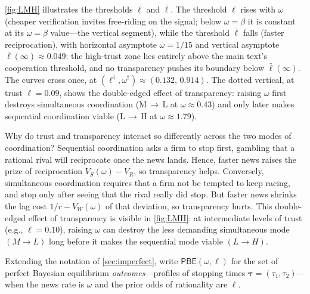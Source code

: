 \documentclass[12pt,reqno]{article}
\newcommand{\PBE}{\ensuremath{\mathsf{PBE}}}
\theoremstyle{definition} \newtheorem{example}{Example}
\theoremstyle{definition} \newtheorem{condition}{Condition}
\theoremstyle{definition} \newtheorem{corollary}{Corollary}
\theoremstyle{definition} \newtheorem{claim}{Claim}
\theoremstyle{definition} \newtheorem{definition}{Definition}
\theoremstyle{definition} \newtheorem{conjecture}{Conjecture}
\theoremstyle{definition} \newtheorem{Lemma}{Lemma}
\theoremstyle{definition} \newtheorem{lemma}{Lemma}
\theoremstyle{plain} \newtheorem{theorem}{Theorem}
\theoremstyle{definition} \newtheorem{assumption}{Assumption}
\theoremstyle{definition} \newtheorem*{assumptionnonumber}{Assumption}
\theoremstyle{definition} \newtheorem*{theoremNoNumber}{Proposition}
\theoremstyle{definition}
\theoremstyle{definition}\newtheorem{proposition}{Proposition}
\theoremstyle{definition} \newtheorem{result}{Result}
\theoremstyle{definition} \newtheorem*{definitionNoNumber}{Definition}
\theoremstyle{definition} \newtheorem{Definition}{Definition}
\theoremstyle{definition} \newtheorem*{DefinitionNoNumber}{Definition}
\theoremstyle{definition} \newtheorem*{fact}{Fact}
\theoremstyle{definition} \newtheorem*{property}{Property}
\theoremstyle{definition} \newtheorem{remark}{Remark}
\begin{document}
\cref{fig:LMH} illustrates the thresholds $\underline \ell$ and $\overline \ell$. The threshold $\underline\ell$ rises with $\omega$ (cheaper verification invites free-riding on the signal; below $\omega=\beta$ it is constant at its $\omega=\beta$ value---the vertical segment), while the threshold $\bar\ell$ falls (faster reciprocation), with horizontal asymptote $\bar\omega=1/15$ and vertical asymptote $\bar\ell(\infty)\approx0.049$: the high-trust zone lies entirely above the main text's cooperation threshold, and no transparency pushes its boundary below $\bar\ell(\infty)$. The curves cross once, at $(\ell^\dagger,\omega^\dagger)\approx(0.132,\,0.914)$. The dotted vertical, at trust $\ell=0.09$, shows the double-edged effect of transparency: raising $\omega$ first destroys simultaneous coordination (M$\,\to\,$L at $\omega\approx0.43$) and only later makes sequential coordination viable (L$\,\to\,$H at $\omega\approx1.79$). 

Why do trust and transparency interact so differently across the two modes of coordination? Sequential coordination asks a firm to stop first, gambling that a rational rival will reciprocate once the news lands. Hence, faster news raises the prize of reciprocation $V_S(\omega)-V_R$, so transparency helps. Conversely, simultaneous coordination requires that a firm not be tempted to keep racing, and stop only after seeing that the rival really did stop. But faster news shrinks the lag cost $1/r-V_W(\omega)$ of that deviation, so transparency hurts. This double-edged effect of transparency is visible in \cref{fig:LMH}: at intermediate levels of trust (e.g., $\ell = 0.10$), raising $\omega$ can destroy the less demanding simultaneous mode $(M \to L)$ long before it makes the sequential mode viable $(L \to H)$.



Extending the notation of \cref{sec:imperfect}, write $\PBE(\omega,\ell)$ for the set of perfect Bayesian equilibrium \emph{outcomes}---profiles of stopping times $\bm\tau=(\tau_1,\tau_2)$---when the news rate is $\omega$ and the prior odds of rationality are $\ell$.
\end{document}

